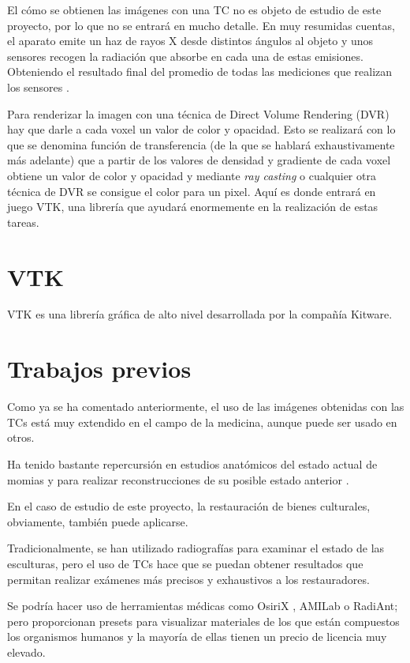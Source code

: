 El cómo se obtienen las imágenes con una TC no es objeto de estudio de este proyecto, por lo que no se entrará en mucho detalle. En muy resumidas cuentas, el aparato emite un haz de rayos X desde distintos ángulos al objeto y unos sensores recogen la radiación que absorbe en cada una de estas emisiones. Obteniendo el resultado final del promedio de todas las mediciones que realizan los sensores \cite{tac}. 

Para renderizar la imagen con una técnica de Direct Volume Rendering (DVR) hay que darle a cada voxel un valor de color y opacidad. Esto se realizará con lo que se denomina función de transferencia (de la que se hablará exhaustivamente más adelante) que a partir de los valores de densidad y gradiente de cada voxel obtiene un valor de color y opacidad y mediante \textit{ray casting} o cualquier otra técnica de DVR se consigue el color para un pixel. Aquí es donde entrará en juego VTK, una librería que ayudará enormemente en la realización de estas tareas.

\section{VTK} 

VTK es una librería gráfica de alto nivel desarrollada por la compañía Kitware.


\section{Trabajos previos}

Como ya se ha comentado anteriormente, el uso de las imágenes obtenidas con las TCs está muy extendido en el campo de la medicina, aunque puede ser usado en otros. 

Ha tenido bastante repercursión en estudios anatómicos del estado actual de momias \cite{mummies} y para realizar reconstrucciones de su posible estado anterior \cite{mummies_reconstruction}.

En el caso de estudio de este proyecto, la restauración de bienes culturales, obviamente, también puede aplicarse.

Tradicionalmente, se han utilizado radiografías para examinar el estado de las esculturas, pero el uso de TCs hace que se puedan obtener resultados que permitan realizar exámenes más precisos y exhaustivos a los restauradores.

Se podría hacer uso de herramientas médicas como OsiriX \cite{osirix}, AMILab \cite{amilab} o RadiAnt; pero proporcionan presets para visualizar materiales de los que están compuestos los organismos humanos y la mayoría de ellas tienen un precio de licencia muy elevado.

